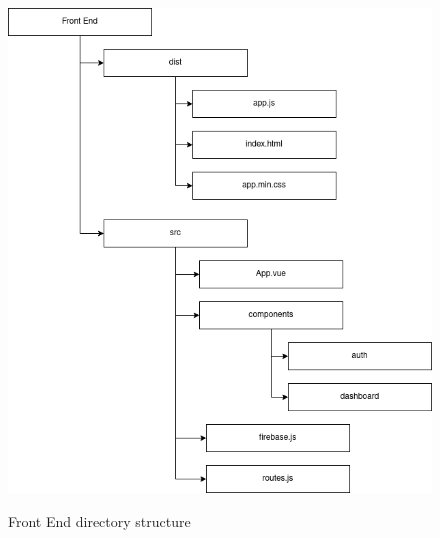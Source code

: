 \documentclass[ 12pt,a4paper,twocolumn,fleqn]{article}
\begin{document}
\begin{adjustwidth}{3.5em}{0pt}
\hspace{0.2cm}

\begin{figure}[H]
\begin{center}
    \hspace*{0.4in}
    \includegraphics[scale=0.6]{media/frontend.png}
    \\
  \caption{ Front End directory structure}
\end{center}
\end{figure}

\hspace{0.2cm}


\end{adjustwidth}
\end{document}
